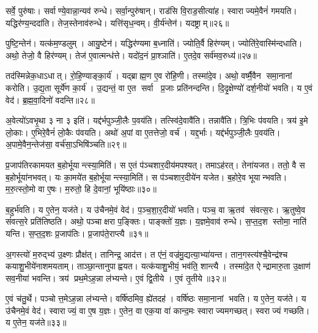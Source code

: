 सर्वे॒ पुरु॑षाः।
सर्वाण्ये॒वान्ना॒न्यव॑ रुन्धे।
सर्वा॒न्पुरु॑षान्।
राड॑सि वि॒राड॒सीत्या॑ह।
स्वाराज्यमे॒वैनं॑ गमयति।
यद्धिर॑ण्य॒न्ददा॑ति।
तेज॒स्तेनाव॑रुन्धे।
यत्ति॑सृध॒न्वम्।
वी॒र्य॑न्तेन॑।
यदष्ट्राम्॥२६॥

पुष्टि॒न्तेन॑।
यत्क॑म॒ण्डलुम्।
आयु॒ष्टेन॑।
यद्धिर॑ण्यमा ब॒ध्नाति॑।
ज्योति॒र्वै हिर॑ण्यम्।
ज्योति॑रे॒वास्मि॑न्दधाति।
अथो॒ तेजो॒ वै हिर॑ण्यम्।
तेज॑ ए॒वात्मन्ध॑त्ते।
यदो॑द॒नं प्रा॒श्ञाति॑।
ए॒तदे॒व सर्व॑मव॒रुध्य॑॥२७॥

तद॑स्मिन्नेक॒धाऽधात्।
रो॒हि॒ण्याङ्का॒र्य॑।
यद्ब्राह्म॒ण ए॒व रो॑हि॒णी।
तस्मा॑दे॒व।
अथो॒ वर्ष्मै॒वैन समा॒नानां करोति।
उ॒द्य॒ता सूर्ये॑ण का॒र्य॑।
उ॒द्यन्तं॒ वा ए॒त सर्वा प्र॒जाः प्रति॑नन्दन्ति।
दि॒दृ॒क्षेण्यो॑ दर्\mbox{}श॒नीयो॑ भवति।
य ए॒वं वेद॑।
ब्र॒ह्म॒वा॒दिनो॑ वदन्ति॥२८॥

अ॒वेत्यो॑ऽवभृ॒था ३ ना ३ इति॑।
यद्द॑र्भपुञ्जी॒लैः प॒वय॑ति।
तत्स्वि॑दे॒वावै॑ति।
तन्नावै॑ति।
त्रि॒भिः प॑वयति।
त्रय॑ इ॒मे लो॒काः।
ए॒भिरे॒वैनं॑ लो॒कैः प॑वयति।
अथो॑ अ॒पां वा ए॒तत्तेजो॒ वर्च॑।
यद्द॒र्भाः।
यद्द॑र्भपुञ्जी॒लैः प॒वय॑ति।
अ॒पामे॒वैन॒न्तेज॑सा॒ वर्च॑सा॒ऽभिषि॑ञ्चति॥२९॥\anuvakamend[भ॒व॒न्त्यष्ट्रा॑मव॒रुध्य॑ वदन्ति द॒र्भा यद्द॑र्भपुञ्जी॒लैः प॒वय॒त्येकं च]

प्र॒जाप॑तिरकामयत ब॒होर्भूयान्त्स्या॒मिति॑।
स ए॒तं प॑ञ्चशार॒दीय॑मपश्यत्।
तमाऽह॑रत्।
तेना॑यजत।
ततो॒ वै स ब॒होर्भूया॑नभवत्।
यः का॒मये॑त ब॒होर्भूयान्त्स्या॒मिति॑।
स प॑ञ्चशार॒दीये॑न यजेत।
ब॒होरे॒व भूयान्भवति।
म॒रु॒त्स्तो॒मो वा ए॒षः।
म॒रुतो॒ हि दे॒वानां॒ भूयि॑ष्ठाः॥३०॥

ब॒हुर्भ॑वति।
य ए॒तेन॒ यज॑ते।
य उ॑चैनमे॒वं वेद॑।
प॒ञ्च॒शा॒र॒दीयो॑ भवति।
पञ्च॒ वा ऋ॒तव॑ संवत्स॒रः।
ऋ॒तुष्वे॒व सं॑वत्स॒रे प्रति॑तिष्ठति।
अथो॒ पञ्चाक्षरा प॒ङ्क्तिः।
पाङ्क्तो॑ य॒ज्ञः।
य॒ज्ञमे॒वाव॑ रुन्धे।
स॒प्त॒द॒श स्तोमा॒ नाति॑ यन्ति।
स॒प्त॒द॒शः प्र॒जाप॑तिः।
प्र॒जाप॑ते॒राप्त्यै॥३१॥\anuvakamend[भूयि॑ष्ठा यन्ति॒ द्वे च॑]

अ॒गस्त्यो॑ म॒रुद्भ्य॑ उ॒क्ष्णः प्रौक्ष॑त्।
तानिन्द्र॒ आद॑त्त।
त ए॑नं॒ वज्र॑मु॒द्यत्या॒भ्या॑यन्त।
तान॒गस्त्य॑श्चै॒वेन्द्र॑श्च कयाशु॒भीये॑नाशमयताम्।
ताञ्छा॒न्तानुपाह्वयत।
यत्क॑याशु॒भीयं॒ भव॑ति॒ शान्त्यै।
तस्मा॑दे॒त ऐन्द्रामारु॒ता उ॒क्षाण॑ सव॒नीया॑ भवन्ति।
त्रय॑ प्रथ॒मेऽह॒न्ना ल॑भ्यन्ते।
ए॒वं द्वि॒तीये।
ए॒वं तृ॒तीये॥३२॥

ए॒वं च॑तु॒र्थे।
पञ्चोत्त॒मेऽह॒न्ना ल॑भ्यन्ते।
वर्\mbox{}षि॑ष्ठमिव॒ ह्ये॑तदह॑।
वर्\mbox{}षि॑ष्ठः समा॒नानां भवति।
य ए॒तेन॒ यज॑ते।
य उ॑चैनमे॒वं वेद॑।
स्वाराज्यं॒ वा ए॒ष य॒ज्ञः।
ए॒तेन॒ वा एक॒या वा॑ कान्द॒मः स्वाराज्यमगच्छत्।
स्वराज्यं गच्छति।
य ए॒तेन॒ यज॑ते॥३३॥

